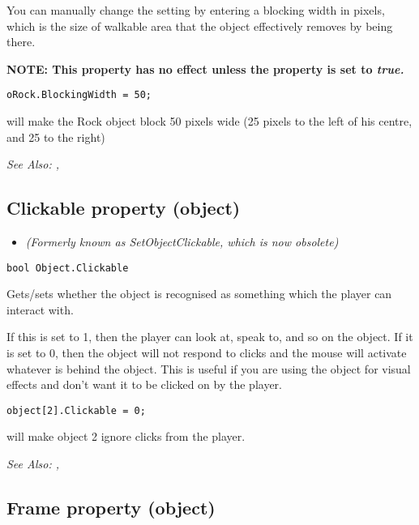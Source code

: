 You can manually change the setting by entering a blocking width in pixels, which is the
size of walkable area that the object effectively removes by being there.

\bf{NOTE:} This property has no effect unless the  property
is set to \it{true}.

\begin{verbatim}
oRock.BlockingWidth = 50;
\end{verbatim}
will make the Rock object block 50 pixels wide (25 pixels to the left of his centre, and 25 to the right)

\it{See Also:} ,


\subsection{Clickable property (object)}\label{Object.Clickable}%

\begin{itemize}
\item \it{(Formerly known as SetObjectClickable, which is now obsolete)}
\end{itemize}

\begin{verbatim}
bool Object.Clickable
\end{verbatim}
Gets/sets whether the object is recognised as something which the player can
interact with.

If this is set to 1, then the player can look at, speak to, and so on the
object. If it is set to 0, then the object will not respond to clicks and
the mouse will activate whatever is behind the object.
This is useful if you are using the object for visual effects and don't
want it to be clicked on by the player.

\begin{verbatim}
object[2].Clickable = 0;
\end{verbatim}
will make object 2 ignore clicks from the player.

\it{See Also:} ,


\subsection{Frame property (object)}\label{Object.Frame}%

